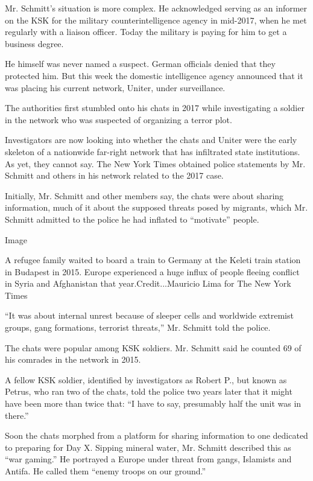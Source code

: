 Mr. Schmitt's situation is more complex. He acknowledged serving as an
informer on the KSK for the military counterintelligence agency in
mid-2017, when he met regularly with a liaison officer. Today the
military is paying for him to get a business degree.

He himself was never named a suspect. German officials denied that they
protected him. But this week the domestic intelligence agency announced
that it was placing his current network, Uniter, under surveillance.

The authorities first stumbled onto his chats in 2017 while
investigating a soldier in the network who was suspected of organizing a
terror plot.

Investigators are now looking into whether the chats and Uniter were the
early skeleton of a nationwide far-right network that has infiltrated
state institutions. As yet, they cannot say. The New York Times obtained
police statements by Mr. Schmitt and others in his network related to
the 2017 case.

Initially, Mr. Schmitt and other members say, the chats were about
sharing information, much of it about the supposed threats posed by
migrants, which Mr. Schmitt admitted to the police he had inflated to
``motivate'' people.

Image

A refugee family waited to board a train to Germany at the Keleti train
station in Budapest in 2015. Europe experienced a huge influx of people
fleeing conflict in Syria and Afghanistan that year.Credit...Mauricio
Lima for The New York Times

``It was about internal unrest because of sleeper cells and worldwide
extremist groups, gang formations, terrorist threats,'' Mr. Schmitt told
the police.

The chats were popular among KSK soldiers. Mr. Schmitt said he counted
69 of his comrades in the network in 2015.

A fellow KSK soldier, identified by investigators as Robert P., but
known as Petrus, who ran two of the chats, told the police two years
later that it might have been more than twice that: ``I have to say,
presumably half the unit was in there.''

Soon the chats morphed from a platform for sharing information to one
dedicated to preparing for Day X. Sipping mineral water, Mr. Schmitt
described this as ``war gaming.'' He portrayed a Europe under threat
from gangs, Islamists and Antifa. He called them ``enemy troops on our
ground.''

